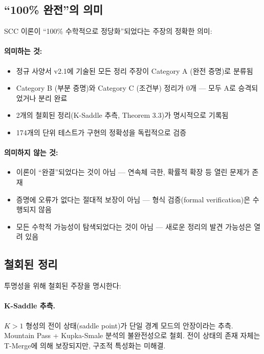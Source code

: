 \subsection{``100\% 완전''의 의미}

SCC 이론이 ``100\% 수학적으로 정당화''되었다는 주장의 정확한 의미:

\paragraph{의미하는 것:}
\begin{itemize}
    \item 정규 사양서 v2.1에 기술된 모든 정리 주장이 Category A (완전 증명)로 분류됨
    \item Category B (부분 증명)와 Category C (조건부) 정리가 0개 --- 모두 A로 승격되었거나 분리 완료
    \item 2개의 철회된 정리(K-Saddle 추측, Theorem 3.3)가 명시적으로 기록됨
    \item 174개의 단위 테스트가 구현의 정확성을 독립적으로 검증
\end{itemize}

\paragraph{의미하지 않는 것:}
\begin{itemize}
    \item 이론이 ``완결''되었다는 것이 아님 --- 연속체 극한, 확률적 확장 등 열린 문제가 존재
    \item 증명에 오류가 없다는 절대적 보장이 아님 --- 형식 검증(formal verification)은 수행되지 않음
    \item 모든 수학적 가능성이 탐색되었다는 것이 아님 --- 새로운 정리의 발견 가능성은 열려 있음
\end{itemize}

\subsection{철회된 정리}

투명성을 위해 철회된 주장을 명시한다:

\paragraph{K-Saddle 추측.} $K > 1$ 형성의 전이 상태(saddle point)가 단일 경계 모드의 안장이라는 추측. Mountain Pass + Kupka-Smale 분석의 불완전성으로 철회. 전이 상태의 존재 자체는 T-Merge에 의해 보장되지만, 구조적 특성화는 미해결.

